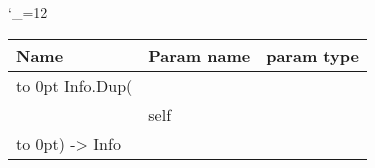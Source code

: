 \begingroup \catcode`\_=12 \tt
\begin{tabular}{lll}
\toprule
\textrm{Name}&\textrm{Param name}&\textrm{param type}\\
\midrule
\hbox to 0pt {Info.Dup(\hss}\\
& self\\
\hbox to 0pt{) -> Info\hss}\\
\bottomrule
\end{tabular}
\endgroup
